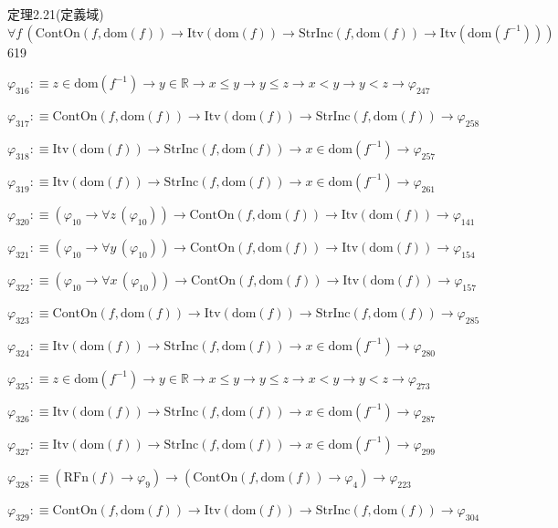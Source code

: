 \begin{fullproof}{定理2.21(定義域)}{$\forall f\,(\mathrm{ContOn}(f,\mathrm{dom}(f)) \to \mathrm{Itv}(\mathrm{dom}(f)) \to \mathrm{StrInc}(f,\mathrm{dom}(f)) \to \mathrm{Itv}(\mathrm{dom}(f^{-1})))$}{619}
\begin{abbrevlist}
\item $\varphi_{316} :\equiv z \in \mathrm{dom}(f^{-1}) \to y \in \mathbb{R} \to x \leq y \to y \leq z \to x < y \to y < z \to \varphi_{247}$
\item $\varphi_{317} :\equiv \mathrm{ContOn}(f,\mathrm{dom}(f)) \to \mathrm{Itv}(\mathrm{dom}(f)) \to \mathrm{StrInc}(f,\mathrm{dom}(f)) \to \varphi_{258}$
\item $\varphi_{318} :\equiv \mathrm{Itv}(\mathrm{dom}(f)) \to \mathrm{StrInc}(f,\mathrm{dom}(f)) \to x \in \mathrm{dom}(f^{-1}) \to \varphi_{257}$
\item $\varphi_{319} :\equiv \mathrm{Itv}(\mathrm{dom}(f)) \to \mathrm{StrInc}(f,\mathrm{dom}(f)) \to x \in \mathrm{dom}(f^{-1}) \to \varphi_{261}$
\item $\varphi_{320} :\equiv (\varphi_{10} \to \forall z\,(\varphi_{10})) \to \mathrm{ContOn}(f,\mathrm{dom}(f)) \to \mathrm{Itv}(\mathrm{dom}(f)) \to \varphi_{141}$
\item $\varphi_{321} :\equiv (\varphi_{10} \to \forall y\,(\varphi_{10})) \to \mathrm{ContOn}(f,\mathrm{dom}(f)) \to \mathrm{Itv}(\mathrm{dom}(f)) \to \varphi_{154}$
\item $\varphi_{322} :\equiv (\varphi_{10} \to \forall x\,(\varphi_{10})) \to \mathrm{ContOn}(f,\mathrm{dom}(f)) \to \mathrm{Itv}(\mathrm{dom}(f)) \to \varphi_{157}$
\item $\varphi_{323} :\equiv \mathrm{ContOn}(f,\mathrm{dom}(f)) \to \mathrm{Itv}(\mathrm{dom}(f)) \to \mathrm{StrInc}(f,\mathrm{dom}(f)) \to \varphi_{285}$
\item $\varphi_{324} :\equiv \mathrm{Itv}(\mathrm{dom}(f)) \to \mathrm{StrInc}(f,\mathrm{dom}(f)) \to x \in \mathrm{dom}(f^{-1}) \to \varphi_{280}$
\item $\varphi_{325} :\equiv z \in \mathrm{dom}(f^{-1}) \to y \in \mathbb{R} \to x \leq y \to y \leq z \to x < y \to y < z \to \varphi_{273}$
\item $\varphi_{326} :\equiv \mathrm{Itv}(\mathrm{dom}(f)) \to \mathrm{StrInc}(f,\mathrm{dom}(f)) \to x \in \mathrm{dom}(f^{-1}) \to \varphi_{287}$
\item $\varphi_{327} :\equiv \mathrm{Itv}(\mathrm{dom}(f)) \to \mathrm{StrInc}(f,\mathrm{dom}(f)) \to x \in \mathrm{dom}(f^{-1}) \to \varphi_{299}$
\item $\varphi_{328} :\equiv (\mathrm{RFn}(f) \to \varphi_{9}) \to (\mathrm{ContOn}(f,\mathrm{dom}(f)) \to \varphi_{4}) \to \varphi_{223}$
\item $\varphi_{329} :\equiv \mathrm{ContOn}(f,\mathrm{dom}(f)) \to \mathrm{Itv}(\mathrm{dom}(f)) \to \mathrm{StrInc}(f,\mathrm{dom}(f)) \to \varphi_{304}$

\end{abbrevlist}
\end{fullproof}
